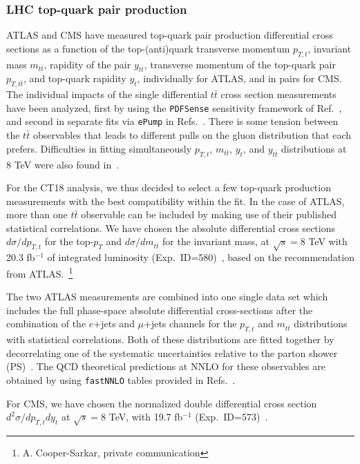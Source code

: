 \subsubsection{LHC top-quark pair production}
\label{sec:DataTop}

%
% 
ATLAS and CMS have measured top-quark pair production differential cross sections as a function of the top-(anti)quark transverse momentum $p_{T,t}$, invariant mass $m_{t\bar{t}}$, rapidity of the pair $y_{t\bar{t}}$, transverse momentum of the top-quark pair $p_{T, t\bar{t}}$, and top-quark
rapidity $y_t$, individually for ATLAS, and in pairs for CMS. The individual impacts of the single differential $t\bar{t}$ cross section measurements have been analyzed, first by
using the \texttt{PDFSense} sensitivity framework of Ref.~\cite{Wang:2018heo}, and second in separate fits via \texttt{ePump} in Refs.~\cite{Hou:2019gfw,Hou:2019jxd}. There is some tension between the $t\bar t$ observables that leads to different pulls on the gluon distribution that each prefers. 
Difficulties in fitting simultaneously $p_{T,t}$, $m_{t\bar{t}}$, $y_{t}$, and $y_{t\bar{t}}$ distributions at 8 TeV were also found in~\cite{Bailey:2019yze,Hou:2019gfw,Hou:2019jxd}.

For the CT18 analysis, we thus decided to select a few top-quark production measurements with the best compatibility within the fit.  In the case of ATLAS, more than one $t\bar t$ observable can be included by making use of their published statistical correlations. We have chosen the  absolute differential cross sections $d\sigma/dp_{T,t}$ for the top-$p_T$ and $d\sigma/dm_{t\bar{t}}$ for the invariant mass, at $\sqrt{s}=8$ TeV with 20.3 fb$^{-1}$ of integrated luminosity (Exp.~ID=580)~\cite{Aad:2015mbv}, based on the recommendation from ATLAS.~\footnote{A. Cooper-Sarkar, private communication} 

The two ATLAS measurements are combined into one single data set which includes the full phase-space absolute differential cross-sections after the combination of the $e$+jets and
$\mu$+jets channels for the $p_{T,t}$ and $m_{t\bar{t}}$ distributions with statistical correlations. Both of these distributions are fitted together by decorrelating one of the
systematic uncertainties relative to the parton shower (PS)~\cite{Bogdan}. The QCD theoretical predictions at NNLO for these observables are obtained by
using \texttt{fastNNLO} tables provided in Refs.~\cite{Czakon:2017dip,fastnnlo:grids}.

For CMS, we
have chosen the normalized double differential cross section $d^2 \sigma/dp_{T,t}dy_t$  at $\sqrt{s}=8$ TeV, with 19.7 fb$^{-1}$ (Exp.~ID=573)~\cite{Sirunyan:2017azo}. 

